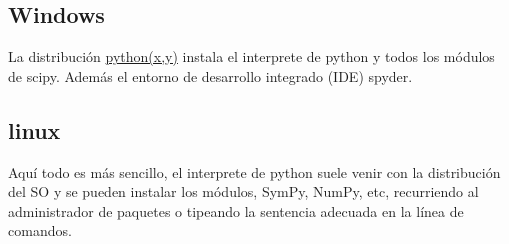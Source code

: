 \subsection{Windows} La distribución  \href{https://code.google.com/p/pythonxy/}{python(x,y)}  instala el interprete de python y todos los módulos de scipy. Además el entorno de desarrollo integrado (IDE) spyder.


\subsection{linux} Aquí todo es más sencillo, el interprete de python suele venir con 
la distribución del SO y se pueden instalar los módulos, SymPy, NumPy, etc, 
recurriendo al administrador de paquetes o tipeando la sentencia adecuada en la línea 
de comandos.  

